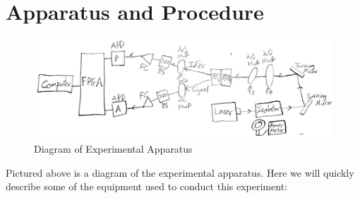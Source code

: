 \documentclass{article}
\begin{document}
\section{Apparatus and Procedure}
    \begin{figure}[H] %
        \centering
        \includegraphics[scale = 0.2]{6.JPG}
        \caption{Diagram of Experimental Apparatus}
        \label{fig:my_label}
    \end{figure}
    Pictured above is a diagram of the experimental apparatus. Here we will quickly describe some of the equipment used to conduct this experiment:
\end{document}
